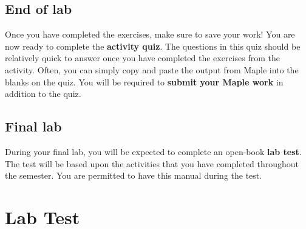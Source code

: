 
\subsection*{End of lab}
Once you have completed the exercises, make sure to save your work! You are now ready to complete the \textbf{activity quiz}. The questions in this quiz should be relatively quick to answer once you have completed the exercises from the activity. Often, you can simply copy and paste the output from Maple into the blanks on the quiz. You will be required to \textbf{submit your Maple work} in addition to the quiz.


\subsection*{Final lab}
During your final lab, you will be expected to complete an open-book \textbf{lab test}. The test will be based upon the activities that you have completed throughout the semester. You are permitted to have this manual during the test.



\section{Lab Test}
\label{sec:lab_test}

